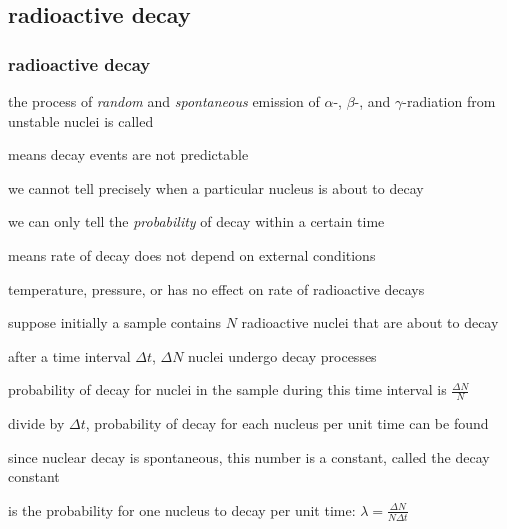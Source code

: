 



\subsection{radioactive decay}

\subsubsection{radioactive decay}

\rcyskip

\begin{ilight}
	the process of \emph{random} and \emph{spontaneous} emission of $\alpha$-, $\beta$-, and $\gamma$-radiation from unstable nuclei is called 
\end{ilight}

\cmt {} means decay events are not predictable

we cannot tell precisely when a particular nucleus is about to decay

we can only tell the \emph{probability} of decay within a certain time

\cmt {} means rate of decay does not depend on external conditions

temperature, pressure, or has no effect on rate of radioactive decays

\vspace*{\baselineskip}

suppose initially a sample contains $N$ radioactive nuclei that are about to decay

after a time interval $\Delta t$, $\Delta N$ nuclei undergo decay processes

probability of decay for nuclei in the sample during this time interval is $\frac{\Delta N}{N}$

divide by $\Delta t$, probability of decay for each nucleus per unit time can be found

since nuclear decay is spontaneous, this number is a constant, called the decay constant

\begin{ilight}
	 is the probability for one nucleus to decay per unit time: $\boxed{\lambda = \frac{\Delta N}{N\Delta t}}$
\end{ilight}

